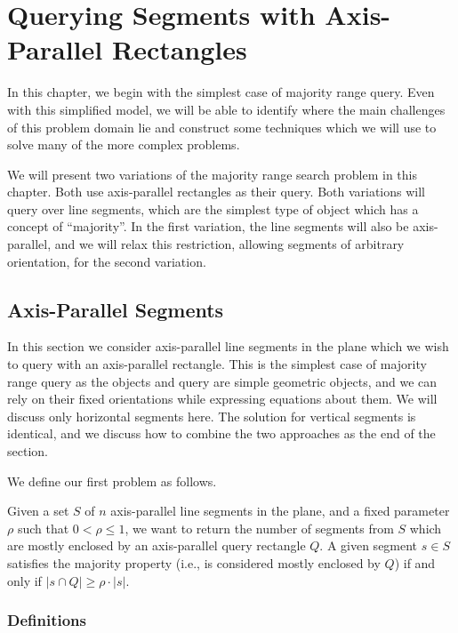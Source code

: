 \chapter{Querying Segments with Axis-Parallel Rectangles}
\label{:rectangles}

In this chapter, we begin with the simplest case of majority range query.  Even with this simplified model, we will be able to identify where the main challenges of this problem domain lie and construct some techniques which we will use to solve many of the more complex problems.

We will present two variations of the majority range search problem in this chapter. Both use axis-parallel rectangles as their query. Both variations will query over line segments, which are the simplest type of object which has a concept of ``majority''.  In the first variation, the line segments will also be axis-parallel, and we will relax this restriction, allowing segments of arbitrary orientation, for the second variation.

\section{Axis-Parallel Segments}
\label{:rectangles:ap}

In this section we consider axis-parallel line segments in the plane which we wish to query with an axis-parallel rectangle.  This is the simplest case of majority range query as the objects and query are simple geometric objects, and we can rely on their fixed orientations while expressing equations about them. We will discuss only horizontal segments here.  The solution for vertical segments is identical, and we discuss how to combine the two approaches as the end of the section.

We define our first problem as follows.

\begin{problem}
Given a set $S$ of $n$ axis-parallel line segments in the plane, and a fixed parameter $\rho$ such that $0 < \rho \leq 1$, we want to return the number of segments from $S$ which are mostly enclosed by an axis-parallel query rectangle $Q$. A given segment $s \in S$ satisfies the majority property (i.e., is considered mostly enclosed by $Q$) if and only if $|s \cap Q| \geq \rho \cdot |s|$.
\end{problem}


\subsection{Definitions}
\label{:rectangles:ap:defs}

